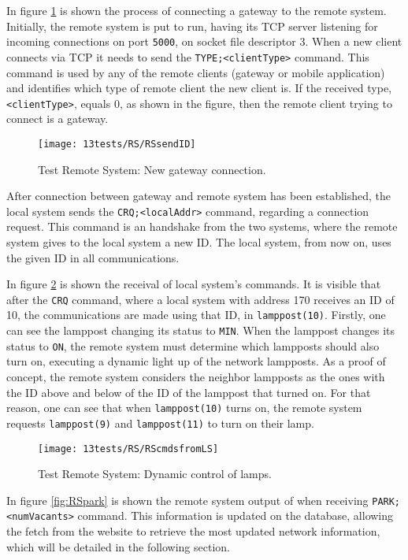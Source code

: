 In figure \ref{fig:rsnewgateway} is shown the process of connecting a gateway to the remote system. Initially, the remote system is put to run, having its TCP server listening for incoming connections on port \verb|5000|, on socket file descriptor 3. When a new client connects via TCP it needs to send the \verb|TYPE;<clientType>| command. This command is used by any of the remote clients (gateway or mobile application) and identifies which type of remote client the new client is. If the received type, \verb|<clientType>|, equals 0, as shown in the figure, then the remote client trying to connect is a gateway.

\begin{figure}[H]
	\centering	
	\texttt{[image: 13tests/RS/RSsendID]}
	\caption{Test Remote System: New gateway connection.}
	\label{fig:rsnewgateway}
\end{figure}

After connection between gateway and remote system has been established, the local system sends the \verb|CRQ;<localAddr>| command, regarding a connection request. This command is an handshake from the two systems, where the remote system gives to the local system a new ID. The local system, from now on, uses the given ID in all communications.

In figure \ref{fig:RScmdsfromLS} is shown the receival of local system's commands. It is visible that after the \verb|CRQ| command, where a local system with address 170 receives an ID of 10, the communications are made using that ID, in \verb|lamppost(10)|. Firstly, one can see the lamppost changing its status to \verb|MIN|. When the lamppost changes its status to \verb|ON|, the remote system must determine which lampposts should also turn on, executing a dynamic light up of the network lampposts. As a proof of concept, the remote system considers the neighbor lampposts as the ones with the ID above and below of the ID of the lamppost that turned on. For that reason, one can see that when \verb|lamppost(10)| turns on, the remote system requests \verb|lamppost(9)| and \verb|lamppost(11)| to turn on their lamp.

\begin{figure}[H]
	\centering	
	\texttt{[image: 13tests/RS/RScmdsfromLS]}
	\caption{Test Remote System: Dynamic control of lamps.}
	\label{fig:RScmdsfromLS}
\end{figure}

In figure \ref{fig:RSpark} is shown the remote system output of when receiving \linebreak \verb|PARK;<numVacants>| command. This information is updated on the database, allowing the fetch from the website to retrieve the most updated network information, which will be detailed in the following section.

